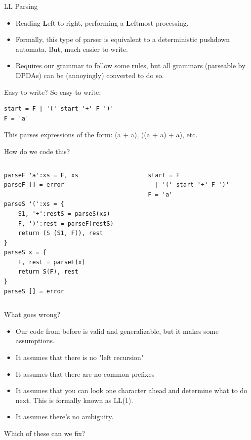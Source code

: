 \documentclass[aspectratio=169]{beamer}
\begin{document}
\begin{frame}{LL Parsing}
    \begin{itemize}
        \item Reading \textbf{L}eft to right, performing a \textbf{L}eftmost processing.
        \item Formally, this type of parser is equivalent to a deterministic pushdown automata. But, much easier to write.
        \item Requires our grammar to follow some rules, but all grammars (parseable by DPDAs) can be (annoyingly) converted to do so. 
    \end{itemize}
\end{frame}

\begin{frame}[fragile]{Easy to write?}
    So easy to write: 
\begin{verbatim}
start = F | '(' start '+' F ')'
F = 'a'
\end{verbatim}
This parses expressions of the form: (a + a), ((a + a) + a), etc. 
\end{frame}

\begin{frame}[fragile]{How do we code this?}
\begin{columns}[T]
    \begin{column}{0.6\textwidth}
        \begin{verbatim}
parseF 'a':xs = F, xs
parseF [] = error

parseS '(':xs = {
    S1, '+':restS = parseS(xs)
    F, ')':rest = parseF(restS)
    return (S (S1, F)), rest
}
parseS x = {
    F, rest = parseF(x)
    return S(F), rest
}
parseS [] = error
\end{verbatim}
    \end{column}
    \begin{column}{0.4\textwidth}
        \begin{verbatim}
start = F 
  | '(' start '+' F ')'
F = 'a'
\end{verbatim}
    \end{column}
\end{columns}

\end{frame}

\begin{frame}{What goes wrong?}
    \begin{itemize}
        \item Our code from before is valid and generalizable, but it makes some assumptions. \pause 
        \item It assumes that there is no "left recursion" \pause
        \item It assumes that there are no common prefixes \pause
        \item It assumes that you can look one character ahead and determine what to do next. This is formally known as LL(1). \pause 
        \item It assumes there's no ambiguity. \pause 
    \end{itemize}
    Which of these can we fix? 
\end{frame}
\end{document}
